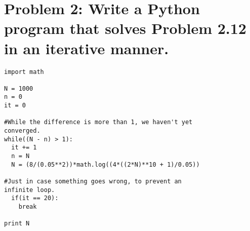 \documentclass[11pt]{article}
\begin{document}
\section*{Problem 2: Write a Python program that solves Problem 2.12 in an iterative manner.}

\begin{lstlisting}[frame=single]
import math

N = 1000
n = 0
it = 0

#While the difference is more than 1, we haven't yet
converged.
while((N - n) > 1):
  it += 1
  n = N
  N = (8/(0.05**2))*math.log((4*((2*N)**10 + 1)/0.05))
  
#Just in case something goes wrong, to prevent an 
infinite loop.
  if(it == 20):
    break

print N
\end{lstlisting}
\end{document}
